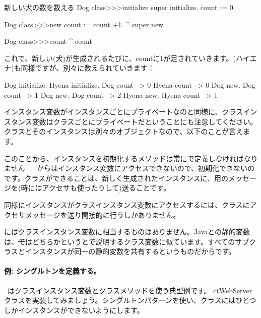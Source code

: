 \documentclass[a4paper,10pt,twoside]{book}
\begin{document}
\begin{method}[dogcount]{新しい犬の数を数える}
Dog class>>>initialize
	super initialize.
	count := 0.

Dog class>>>new
	count := count +1.
	^ super new

Dog class>>>count
	^ count
\end{method}

これで、新しい(犬)が生成されるたびに、countに1が足されていきます。(ハイエナ)も同様ですが、別々に数えられていきます：
\begin{code}{}
Dog initialize.
Hyena initialize.
Dog count     --> 0
Hyena count --> 0
Dog new.
Dog count     --> 1
Dog new.
Dog count     --> 2
Hyena new.
Hyena count --> 1
\end{code}

インスタンス変数がインスタンスごとにプライベートなのと同様に、クラスインスタンス変数はクラスごとにプライベートだということにも注意してください。クラスとそのインスタンスは別々のオブジェクトなので、以下のことが言えます。

このことから、インスタンスを初期化するメソッドは常にで定義しなければなりません --- からはインスタンス変数にアクセスできないので、初期化できないのです。クラスができることは、新しく生成されたインスタンスに、用のメッセージを(時にはアクセサも使ったりして)送ることです。

同様にインスタンスがクラスインスタンス変数にアクセスするには、クラスにアクセサメッセージを送り間接的に行うしかありません。

にはクラスインスタンス変数に相当するものはありません。Javaとの静的変数は、\st ではどちらかというとで説明するクラス変数に似ています。すべてのサブクラスとインスタンスが同一の静的変数を共有するというものだからです。

\paragraph{例: シングルトンを定義する。}
~\cite{Alpe98a}はクラスインスタンス変数とクラスメソッドを使う典型例です。 ct{WebServer}クラスを実装してみましょう。シングルトンパターンを使い、クラスにはひとつしかインスタンスができないようにします。
\end{document}
